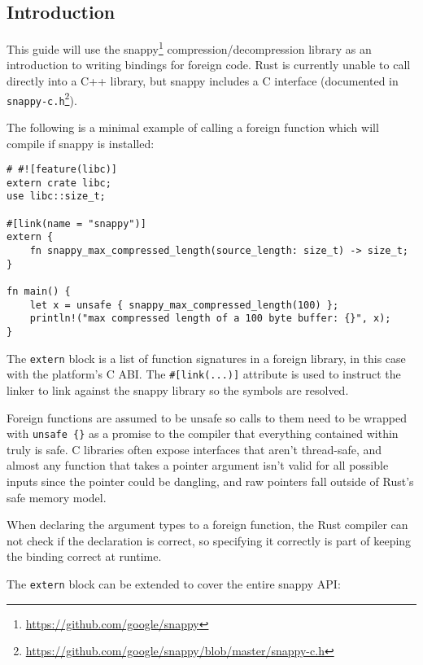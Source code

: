 \documentclass[a4paper,]{book}
\renewcommand{\href}[2]{#2\footnote{\url{#1}}}
\begin{document}
\subsection{Introduction}\label{introduction-1}

This guide will use the \href{https://github.com/google/snappy}{snappy}
compression/decompression library as an introduction to writing bindings
for foreign code. Rust is currently unable to call directly into a C++
library, but snappy includes a C interface (documented in
\href{https://github.com/google/snappy/blob/master/snappy-c.h}{\texttt{snappy-c.h}}).

The following is a minimal example of calling a foreign function which
will compile if snappy is installed:

\begin{verbatim}
# #![feature(libc)]
extern crate libc;
use libc::size_t;

#[link(name = "snappy")]
extern {
    fn snappy_max_compressed_length(source_length: size_t) -> size_t;
}

fn main() {
    let x = unsafe { snappy_max_compressed_length(100) };
    println!("max compressed length of a 100 byte buffer: {}", x);
}
\end{verbatim}

The \texttt{extern} block is a list of function signatures in a foreign
library, in this case with the platform's C ABI. The
\texttt{\#{[}link(...){]}} attribute is used to instruct the linker to
link against the snappy library so the symbols are resolved.

Foreign functions are assumed to be unsafe so calls to them need to be
wrapped with \texttt{unsafe\ \{\}} as a promise to the compiler that
everything contained within truly is safe. C libraries often expose
interfaces that aren't thread-safe, and almost any function that takes a
pointer argument isn't valid for all possible inputs since the pointer
could be dangling, and raw pointers fall outside of Rust's safe memory
model.

When declaring the argument types to a foreign function, the Rust
compiler can not check if the declaration is correct, so specifying it
correctly is part of keeping the binding correct at runtime.

The \texttt{extern} block can be extended to cover the entire snappy
API:
\end{document}
